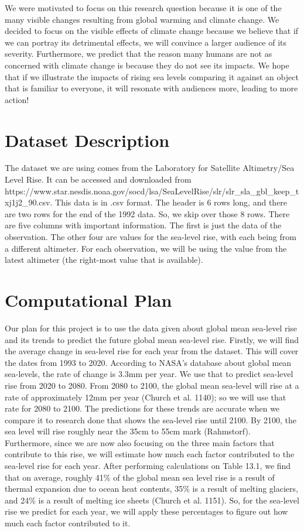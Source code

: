 \documentclass[fontsize=11pt]{article}
\begin{document}
We were motivated to focus on this research question because it is one of the many visible changes resulting from global warming and climate change. We decided to focus on the visible effects of climate change because we believe that if we can portray its detrimental effects, we will convince a larger audience of its severity. Furthermore, we predict that the reason many humans are not as concerned with climate change is because they do not see its impacts. We hope that if we illustrate the impacts of rising sea levels comparing it against an object that is familiar to everyone, it will resonate with audiences more, leading to more action!


\section*{Dataset Description}

The dataset we are using comes from the Laboratory for Satellite Altimetry/Sea Level Rise. It can be accessed and downloaded from https://www.star.nesdis.noaa.gov/socd/lsa/SeaLevelRise/slr/slr\_sla\_gbl\_keep\_txj1j2\_90.csv. This data is in .csv format. The header is 6 rows long, and there are two rows for the end of the 1992 data. So, we skip over those 8 rows. There are five columns with important information. The first is just the data of the observation. The other four are values for the sea-level rise, with each being from a different altimeter. For each observation, we will be using the value from the latest altimeter (the right-most value that is available).

\section*{Computational Plan}

Our plan for this project is to use the data given about global mean sea-level rise and its trends to predict the future global mean sea-level rise. Firstly, we will find the average change in sea-level rise for each year from the dataset. This will cover the dates from 1993 to 2020. According to NASA's database about global mean sea-levels, the rate of change is 3.3mm per year. We use that to predict sea-level rise from 2020 to 2080. From 2080 to 2100, the global mean sea-level will rise at a rate of approximately 12mm per year (Church et al. 1140); so we will use that rate for 2080 to 2100. The predictions for these trends are accurate when we compare it to research done that shows the sea-level rise until 2100. By 2100, the sea level will rise roughly near the 35cm to 55cm mark (Rahmstorf). Furthermore, since we are now also focusing on the three main factors that contribute to this rise, we will estimate how much each factor contributed to the sea-level rise for each year. After performing calculations on Table 13.1, we find that on average, roughly 41\% of the global mean sea level rise is a result of thermal expansion due to ocean heat contents, 35\% is a result of melting glaciers, and 24\% is a result of melting ice sheets (Church et al. 1151). So, for the sea-level rise we predict for each year, we will apply these percentages to figure out how much each factor contributed to it.\\
\end{document}
